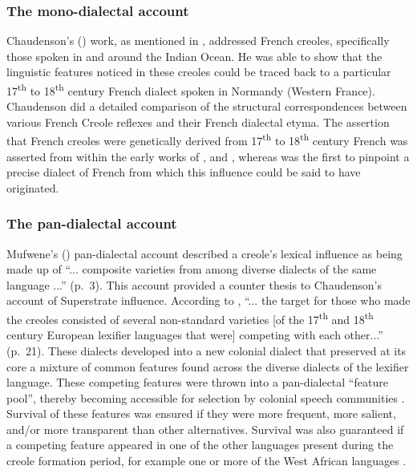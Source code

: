 \subsubsection {The mono-dialectal account}\label{2.2.4.1}
 Chaudenson's (\citeyear{Chaudenson79}) work, as mentioned in , addressed French creoles, specifically those spoken in and around the Indian Ocean. He was able to show that the linguistic features noticed in these creoles could be traced back to a particular 17\textsuperscript{th} to 18\textsuperscript{th} century French dialect spoken in Normandy (Western France). Chaudenson did a detailed comparison of the structural correspondences between various French Creole reflexes and their French dialectal etyma. The assertion that French creoles were genetically derived from 17\textsuperscript{th} to 18\textsuperscript{th} century French was asserted from within the early works of \citet{Hall53}, and \citet{Goodman64}, whereas  \citet{Chaudenson79} was the first to pinpoint a precise dialect of French from which this influence could be said to have originated.

\subsubsection {The pan-dialectal account}\label{2.2.4.2}
Mufwene's (\citeyear{Mufwene01}) pan-dialectal account described a creole's lexical influence as being made up of ``... composite varieties from among diverse dialects of the same language ...'' (p.~3). This account provided a counter thesis to Chaudenson's account of Superstrate influence. According to \citet{Mufwene08}, ``... the target for those who made the creoles consisted of several non-standard varieties [of the 17\textsuperscript{th} and 18\textsuperscript{th} century European lexifier languages that were] competing with each other...'' (p.~21). These dialects developed into a new colonial dialect that preserved at its core a mixture of common features found across the diverse dialects of the lexifier language. These competing features were thrown into a pan-dialectal ``feature pool'', thereby becoming accessible for selection by colonial speech communities \citep{Mufwene08, Mufwene01}. Survival of these features was ensured if they were more frequent, more salient, and/or more transparent than other alternatives. Survival was also guaranteed if a competing feature appeared in one of the other languages present during the creole formation period, for example one or more of the West African languages \citep{Mufwene01}.

